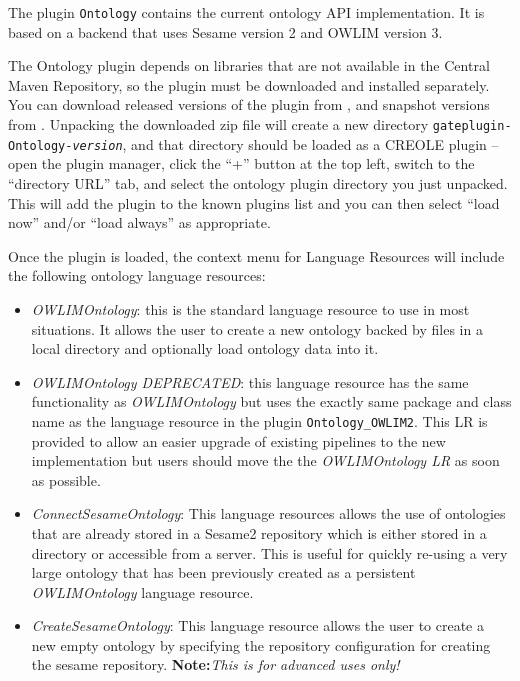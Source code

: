 

The plugin \texttt{Ontology} contains the current ontology API implementation.
It is based on a backend that uses Sesame version 2 and OWLIM version 3. 

The Ontology plugin depends on libraries that are not available in the Central
Maven Repository, so the plugin must be downloaded and installed separately.
You can download released versions of the plugin from
, and
snapshot versions from
.  Unpacking the downloaded zip file will
create a new directory \texttt{gateplugin-Ontology-\emph{version}}, and that
directory should be loaded as a CREOLE plugin -- open the plugin manager, click
the ``+'' button at the top left, switch to the ``directory URL'' tab, and
select the ontology plugin directory you just unpacked.  This will add the
plugin to the known plugins list and you can then select ``load now'' and/or
``load always'' as appropriate.

Once the plugin is loaded, the context menu for Language Resources will
include the following ontology language resources:
\begin{itemize}
 \item \emph{OWLIMOntology}: this is the standard language resource to use in most situations.
 It allows the user to create a new ontology backed by files in a local directory
 and optionally load ontology data into it.
 \item \emph{OWLIMOntology DEPRECATED}: this language resource has the same functionality 
 as \emph{OWLIMOntology} but uses the exactly same package and class name as the 
 language resource in the plugin \verb!Ontology_OWLIM2!. This LR is provided to 
 allow an easier upgrade of existing pipelines to the new implementation but
 users should move the the \emph{OWLIMOntology LR} as soon as possible.
 \item \emph{ConnectSesameOntology}: This language resources allows the use of ontologies
 that are already stored in a Sesame2 repository which is either stored in a 
 directory or accessible from a server. This is useful for quickly re-using a
 very large ontology that has been previously created as a persistent \emph{OWLIMOntology}
 language resource.
 \item \emph{CreateSesameOntology}: This language resource allows the user to create a 
 new empty ontology by specifying the repository configuration for creating 
 the sesame repository. \textbf{Note:}\emph{This is for advanced uses only!}
\end{itemize}

